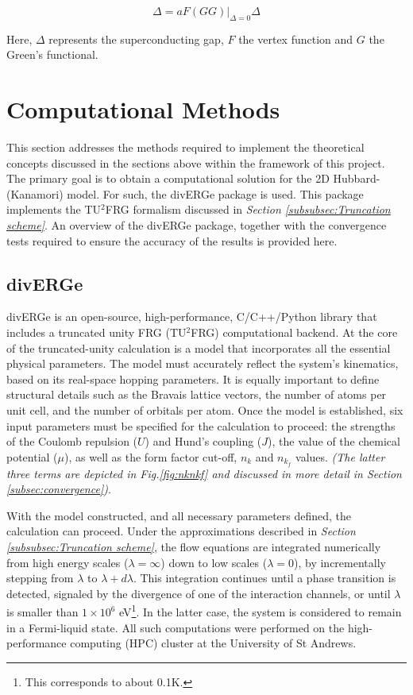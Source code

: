 \documentclass[11pt]{article}
\begin{document}
\begin{equation}\label{gapeq}
    \Delta = aF(GG)|_{\Delta = 0}\Delta
\end{equation}


\noindent Here, $\Delta$ represents the superconducting gap, $F$ the vertex function and $G$ the Green's 
functional. 


\section{Computational Methods}

This section addresses the methods required to implement the theoretical concepts discussed in the sections above
within the framework of this project.
The primary goal is to obtain a computational solution 
for the 2D Hubbard-(Kanamori) model. For such, the divERGe package is used. This package implements the TU$^2$FRG
formalism discussed in \textit{Section \ref{subsubsec:Truncation scheme}}.
An overview of the divERGe package, together with the convergence
tests required to ensure the accuracy of the results is provided here. 

\subsection{divERGe}
\label{subsec:diverge}




\noindent divERGe is an open-source, high-performance, C/C++/Python library that includes a truncated unity FRG (TU$^2$FRG) computational backend\cite{profe2024diverge}. 
At the core of the truncated-unity calculation is a model that incorporates all the essential physical parameters. The model must accurately reflect the system's kinematics, based on its real-space hopping parameters.
It is equally important to define structural details such as the Bravais lattice vectors, the number of atoms per unit cell, 
and the number of orbitals per atom. Once the model is established, six input parameters must be specified for the calculation to proceed: 
the strengths of the Coulomb repulsion ($U$) and Hund’s coupling ($J$), the value of the chemical potential ($\mu$), as well as the form factor cut-off, $n_k$ and $n_{k_f}$
values. \textit{(The latter three terms are depicted in Fig.\ref{fig:nknkf} and discussed in more detail in Section \ref{subsec:convergence})}.\par
\medskip
\noindent With the model constructed, and all necessary parameters defined, 
the calculation can proceed. Under the approximations described in \textit{Section \ref{subsubsec:Truncation scheme}},
the flow equations are integrated numerically from high energy scales ($\lambda = \infty$) down to low scales ($\lambda = 0$), 
by incrementally stepping from $\lambda$ to $\lambda + d\lambda$. This integration continues until a phase transition is detected, signaled 
by the divergence of one of the interaction channels, or until $\lambda$ is smaller than $1 \times 10^{6}$ eV\footnote{This corresponds to about 0.1K.}. In the latter case, the system is considered to remain 
in a Fermi-liquid state. All such computations were performed on the high-performance computing (HPC) cluster at the University of St Andrews.
\end{document}
